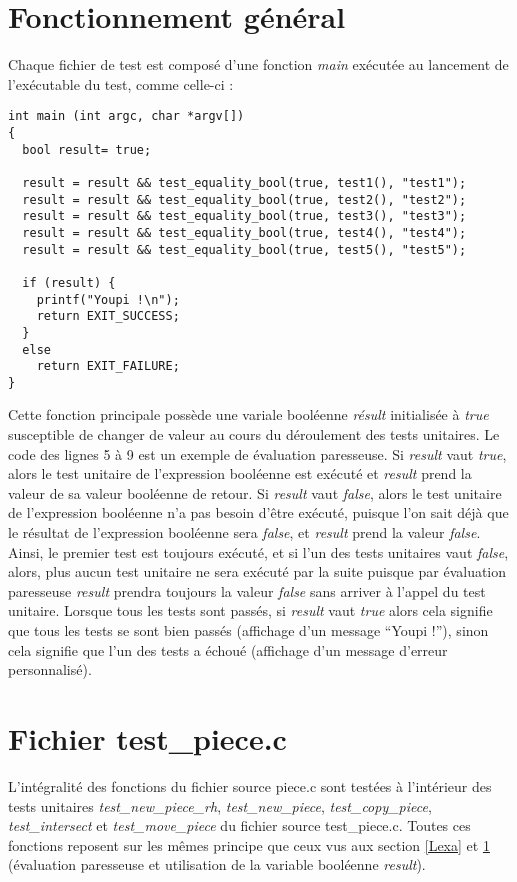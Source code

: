 \documentclass{report}
\begin{document}
\section{Fonctionnement général}
\label{Clarke}
Chaque fichier de test est composé d'une fonction \emph{main} exécutée au lancement de l'exécutable du test, comme celle-ci :
\begin{lstlisting}
int main (int argc, char *argv[])
{
  bool result= true;

  result = result && test_equality_bool(true, test1(), "test1");
  result = result && test_equality_bool(true, test2(), "test2");
  result = result && test_equality_bool(true, test3(), "test3");
  result = result && test_equality_bool(true, test4(), "test4");
  result = result && test_equality_bool(true, test5(), "test5");

  if (result) {
    printf("Youpi !\n");
    return EXIT_SUCCESS;
  }
  else
    return EXIT_FAILURE;
}
\end{lstlisting}

Cette fonction principale possède une variale booléenne \emph{résult} initialisée à \emph{true} susceptible de changer de valeur au cours du déroulement des tests unitaires. Le code des lignes 5 à 9 est un exemple de évaluation paresseuse. Si \emph{result} vaut \emph{true}, alors le test unitaire de l'expression booléenne est exécuté et \emph{result} prend la valeur de sa valeur booléenne de retour. Si \emph{result} vaut \emph{false}, alors le test unitaire de l'expression booléenne n'a pas besoin d'être exécuté, puisque l'on sait déjà que le résultat de l'expression booléenne sera \emph{false}, et \emph{result} prend la valeur \emph{false}. Ainsi, le premier test est toujours exécuté, et si l'un des tests unitaires vaut \emph{false}, alors, plus aucun test unitaire ne sera exécuté par la suite puisque par évaluation paresseuse \emph{result} prendra toujours la valeur \emph{false} sans arriver à l'appel du test unitaire. Lorsque tous les tests sont passés, si \emph{result} vaut \emph{true} alors cela signifie que tous les tests se sont bien passés (affichage d'un message ``Youpi !''), sinon cela signifie que l'un des tests a échoué (affichage d'un message d'erreur personnalisé).

\section{Fichier test\_piece.c}
L'intégralité des fonctions du fichier source piece.c sont testées à l'intérieur des tests unitaires \emph{test\_new\_piece\_rh}, \emph{test\_new\_piece}, \emph{test\_copy\_piece}, \emph{test\_intersect} et \emph{test\_move\_piece} du fichier source test\_piece.c. Toutes ces fonctions reposent sur les mêmes principe que ceux vus aux section \ref{Lexa} et \ref{Clarke} (évaluation paresseuse et utilisation de la variable booléenne \emph{result}).
\end{document}
